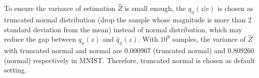 To ensure the variance of estimation $\hat{Z}$ is small enough, the $q_\phi(z|e)$ is chosen as truncated normal distribution (drop the sample whose magnitude is more than 2 standard deviation from the mean) instead of normal distribution, which may reduce the gap between $q_\phi(z)$ and $\hat{q}_\phi(z)$. 
With $10^9$ samples, the variance of $\hat{Z}$ with truncated normal and normal are $0.000967$ (truncated normal) and $0.809260$ (normal) respectively in MNIST. Therefore, truncated normal is chosen as default setting. 


